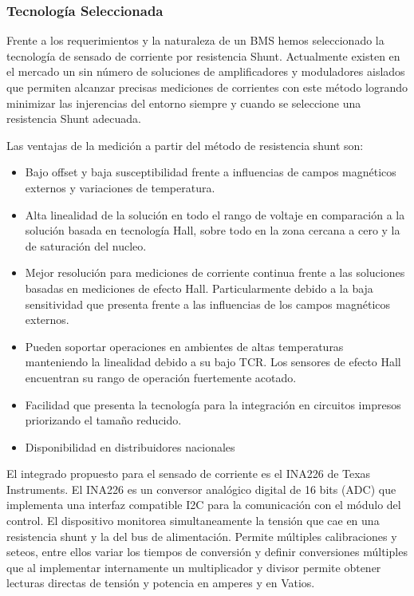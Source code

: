 \documentclass[10pt,a4paper]{article}
\begin{document}
	\subsubsection{Tecnología Seleccionada}
	
	Frente a los requerimientos y la naturaleza de un \acrshort{BMS} hemos seleccionado la tecnología de sensado de corriente por resistencia Shunt. Actualmente existen en el mercado un sin número de soluciones de amplificadores y moduladores aislados que permiten alcanzar precisas mediciones de corrientes con este método logrando minimizar las injerencias del entorno siempre y cuando se seleccione una resistencia Shunt adecuada.
	
	Las ventajas de la medición a partir del método de resistencia shunt son:
	
	\begin{itemize}
		\item Bajo offset y baja susceptibilidad frente a influencias de campos magnéticos externos y variaciones de temperatura.
		\item Alta linealidad de la solución en todo el rango de voltaje en comparación a la solución basada en tecnología Hall, sobre todo en la zona cercana a cero y la de saturación del nucleo. 
		\item Mejor resolución para mediciones de corriente continua frente a las soluciones basadas en mediciones de efecto Hall. Particularmente debido a la baja sensitividad que presenta frente a las influencias de los campos magnéticos externos.
		\item Pueden soportar operaciones en ambientes de altas temperaturas manteniendo la linealidad debido a su bajo TCR. Los sensores de efecto Hall encuentran su rango de operación fuertemente acotado.
		\item Facilidad que presenta la tecnología para la integración en circuitos impresos priorizando el tamaño reducido.
		\item Disponibilidad en distribuidores nacionales
	\end{itemize}
	
	El integrado propuesto para el sensado de corriente es el INA226 de Texas Instruments. El INA226 es un conversor analógico digital de 16 bits (ADC) que implementa una interfaz compatible I2C para la comunicación con el módulo del control. El dispositivo monitorea simultaneamente la tensión que cae en una resistencia shunt y la del bus de alimentación. Permite múltiples calibraciones y seteos, entre ellos variar los tiempos de conversión y definir conversiones múltiples que al implementar internamente un multiplicador y divisor permite obtener lecturas directas de tensión y potencia en amperes y en Vatios.
	
\end{document}
